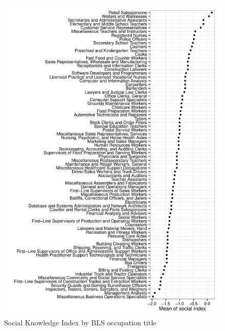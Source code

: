 \documentclass[12pt]{article}
\begin{document}
\begin{figure}
\caption{Social Knowledge Index by BLS occupation title} \label{fig:social_by_occupation}  
\centering
\begin{minipage}{0.85 \linewidth}
\includegraphics[width = \linewidth]{./plots/social_by_occupation.pdf}
\end{minipage}  
\end{figure} 

%
\end{document}
